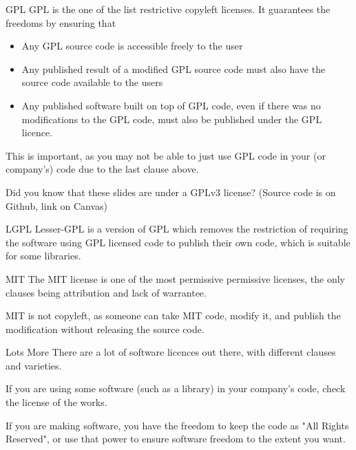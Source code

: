 \begin{frame}{GPL}
  GPL is the one of the list restrictive copyleft licenses. It guarantees the freedoms by ensuring that
  \begin{itemize}
    \item Any GPL source code is accessible freely to the user
    \item Any published result of a modified GPL source code must also have the source code available to the users
    \item Any published software built on top of GPL code, even if there was no modifications to the GPL code, must also be published under the GPL licence.
  \end{itemize} \pause
  This is important, as you may not be able to just use GPL code in your (or company's) code due to the last clause above.\pause

  Did you know that these slides are under a GPLv3 license? (Source code is on Github, link on Canvas)
\end{frame}

\begin{frame}{LGPL}
  Lesser-GPL is a version of GPL which removes the restriction of requiring the software using GPL licensed code to publish their own code, which is suitable for some libraries.
\end{frame}

\begin{frame}{MIT}
  The MIT license is one of the most permissive permissive licenses, the only clauses being attribution and lack of warrantee.

  MIT is not copyleft, as someone can take MIT code, modify it, and publish the modification without releasing the source code.
\end{frame}

\begin{frame}{Lots More}
  There are a lot of software licences out there, with different clauses and varieties.

  If you are using some software (such as a library) in your company's code, check the license of the works.

  If you are making software, you have the freedom to keep the code as "All Rights Reserved", or use that power to ensure software freedom to the extent you want.
\end{frame}


